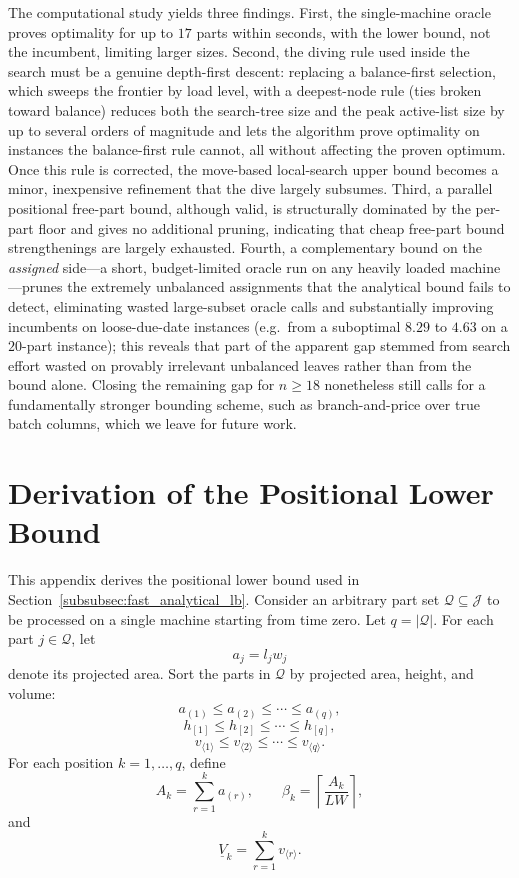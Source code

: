 \documentclass[letterpaper, 10 pt, conference]{ieeeconf}  %
\begin{document}
The computational study yields three findings. First, the single-machine oracle
proves optimality for up to $17$ parts within seconds, with the lower bound, not
the incumbent, limiting larger sizes. Second, the diving rule used inside the
search must be a genuine depth-first descent: replacing a balance-first selection,
which sweeps the frontier by load level, with a deepest-node rule (ties broken
toward balance) reduces both the search-tree size and the peak active-list size by
up to several orders of magnitude and lets the algorithm prove optimality on
instances the balance-first rule cannot, all without affecting the proven optimum.
Once this rule is corrected, the move-based local-search upper bound becomes a
minor, inexpensive refinement that the dive largely subsumes. Third, a parallel positional free-part
bound, although valid, is structurally dominated by the per-part floor and gives
no additional pruning, indicating that cheap free-part bound strengthenings are
largely exhausted. Fourth, a complementary bound on the \emph{assigned} side---a
short, budget-limited oracle run on any heavily loaded machine---prunes the
extremely unbalanced assignments that the analytical bound fails to detect,
eliminating wasted large-subset oracle calls and substantially improving
incumbents on loose-due-date instances (e.g.\ from a suboptimal $8.29$ to $4.63$
on a $20$-part instance); this reveals that part of the apparent gap stemmed from
search effort wasted on provably irrelevant unbalanced leaves rather than from the
bound alone. Closing the remaining gap for $n\ge 18$ nonetheless still calls for a
fundamentally stronger bounding scheme, such as branch-and-price over true batch
columns, which we leave for future work.







\appendix
\section{Derivation of the Positional Lower Bound}
\label{app:positional_lb}

This appendix derives the positional lower bound used in
Section~\ref{subsubsec:fast_analytical_lb}. Consider an arbitrary part set
$\mathcal{Q}\subseteq\mathcal{J}$ to be processed on a single machine
starting from time zero. Let $q=|\mathcal{Q}|$. For each part
$j\in\mathcal{Q}$, let
\[
a_j=l_jw_j
\]
denote its projected area. Sort the parts in $\mathcal{Q}$ by projected
area, height, and volume:
\[
a_{(1)} \le a_{(2)} \le \cdots \le a_{(q)},
\]
\[
h_{[1]} \le h_{[2]} \le \cdots \le h_{[q]},
\]
\[
v_{\langle 1\rangle} \le v_{\langle 2\rangle}
\le \cdots \le v_{\langle q\rangle}.
\]
For each position $k=1,\dots,q$, define
\[
A_k=\sum_{r=1}^{k}a_{(r)},
\qquad
\beta_k=\left\lceil\frac{A_k}{LW}\right\rceil,
\]
and
\[
\underline{V}_k=\sum_{r=1}^{k}v_{\langle r\rangle}.
\]
\end{document}
